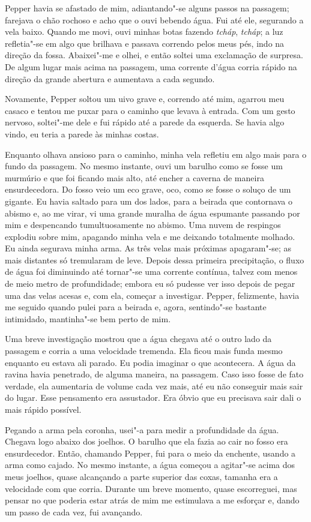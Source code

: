 Pepper havia se afastado de mim, adiantando"-se alguns passos na passagem; farejava o chão rochoso e acho que o ouvi
bebendo água. Fui até ele, segurando a vela baixo. Quando me movi, ouvi minhas botas fazendo \textit{tcháp},
\textit{tcháp}; a luz refletia"-se em algo que brilhava e passava correndo pelos meus pés, indo na direção
da fossa. Abaixei"-me e olhei, e então soltei uma exclamação de surpresa. De algum lugar mais acima na passagem, uma
corrente d’água corria rápido na direção da grande abertura e aumentava a cada segundo.

Novamente, Pepper soltou um uivo grave e, correndo até mim, agarrou meu casaco e tentou me puxar para o caminho que
levava à entrada. Com um gesto nervoso, soltei"-me dele e fui rápido até a parede da esquerda. Se havia algo vindo, eu
teria a parede às minhas costas.

Enquanto olhava ansioso para o caminho, minha vela refletiu em algo mais para o fundo da passagem. No mesmo
instante, ouvi um barulho como se fosse um murmúrio e que foi ficando mais alto, até encher a caverna de maneira
ensurdecedora. Do fosso veio um eco grave, oco, como se fosse o soluço de um gigante. Eu havia saltado para um dos
lados, para a beirada que contornava o abismo e, ao me virar, vi uma grande muralha de água espumante passando por mim
e despencando tumultuosamente no abismo. Uma nuvem de respingos explodiu sobre mim, apagando minha vela e me deixando
totalmente molhado. Eu ainda segurava minha arma. As três velas mais próximas apagaram"-se; as mais distantes só
tremularam de leve. Depois dessa primeira precipitação, o fluxo de água foi diminuindo até tornar"-se uma corrente
contínua, talvez com menos de meio metro de profundidade; embora eu só pudesse ver isso depois de pegar uma das velas
acesas e, com ela, começar a investigar. Pepper, felizmente, havia me seguido quando pulei para a beirada e, agora,
sentindo"-se bastante intimidado, mantinha"-se bem perto de mim.

Uma breve investigação mostrou que a água chegava até o outro lado da passagem e corria a uma velocidade tremenda. Ela
ficou mais funda mesmo enquanto eu estava ali parado. Eu podia imaginar o que acontecera. A água da
ravina havia penetrado, de alguma maneira, na passagem. Caso isso fosse de fato verdade, ela aumentaria de volume cada
vez mais, até eu não conseguir mais sair do lugar. Esse pensamento era assustador. Era óbvio que eu precisava sair dali o
mais rápido possível.

Pegando a arma pela coronha, usei"-a para medir a profundidade da água. Chegava logo abaixo dos joelhos. O barulho que
ela fazia ao cair no fosso era ensurdecedor. Então, chamando Pepper, fui para o meio da enchente, usando a arma como
cajado. No mesmo instante, a água começou a agitar"-se acima dos meus joelhos, quase alcançando a parte superior das
coxas, tamanha era a velocidade com que corria. Durante um breve momento, quase escorreguei, mas pensar no que poderia
estar atrás de mim me estimulava a me esforçar e, dando um passo de cada vez, fui avançando.

